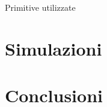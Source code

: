 \documentclass[a4paper,twocolumn]{article}
\begin{document}
\hspace{8em}

Primitive utilizzate

\section{Simulazioni}

\section{Conclusioni}

\end{document}

